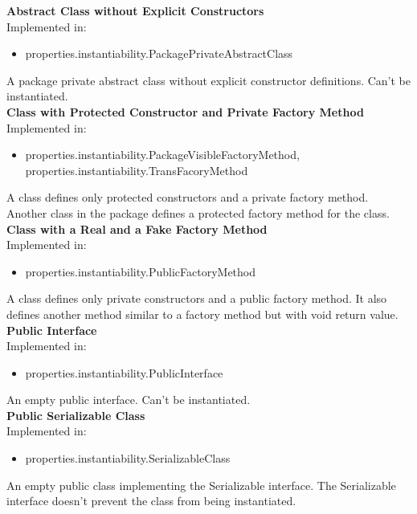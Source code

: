\documentclass{article}
\begin{document}
\noindent
\textbf{Abstract Class without Explicit Constructors}\\
Implemented in: 
\begin{itemize}
    \item properties.instantiability.PackagePrivateAbstractClass
\end{itemize}
A package private abstract class without explicit constructor definitions. Can't be instantiated.\\

\noindent
\textbf{Class with Protected Constructor and Private Factory Method}\\
Implemented in: 
\begin{itemize}
    \item properties.instantiability.PackageVisibleFactoryMethod, properties.instantiability.TransFacoryMethod
\end{itemize}
A class defines only protected constructors and a private factory method. Another class in the package defines a protected factory method for the class.\\

\noindent
\textbf{Class with a Real and a Fake Factory Method}\\
Implemented in: 
\begin{itemize}
    \item properties.instantiability.PublicFactoryMethod
\end{itemize}
A class defines only private constructors and a public factory method. It also defines another method similar to a factory method but with void return value.\\

\noindent
\textbf{Public Interface}\\
Implemented in: 
\begin{itemize}
    \item properties.instantiability.PublicInterface
\end{itemize}
An empty public interface. Can't be instantiated.\\

\noindent
\textbf{Public Serializable Class}\\
Implemented in: 
\begin{itemize}
    \item properties.instantiability.SerializableClass
\end{itemize}
An empty public class implementing the Serializable interface. The Serializable interface doesn't prevent the class from being instantiated.\\
\end{document}
